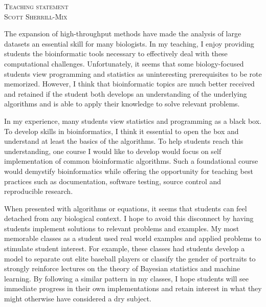 \documentclass[12pt]{article}
\date{\today}
\begin{document}

\begin{center}
\fontsize{19}{21}\textsc{Teaching statement}\\
\vspace{.4em}
\fontsize{14}{17}\textsc{Scott Sherrill-Mix}
\end{center}

The expansion of high-throughput methods have made the analysis of large datasets an essential skill for many biologists. In my teaching, I enjoy providing students the bioinformatic tools necessary to effectively deal with these computational challenges. Unfortunately, it seems that some biology-focused students view programming and statistics as uninteresting prerequisites to be rote memorized. However, I think that bioinformatic topics are much better received and retained if the student both develops an understanding of the underlying algorithms and is able to apply their knowledge to solve relevant problems. 

In my experience, many students view statistics and programming as a black box.  To develop skills in bioinformatics, I think it essential to open the box and understand at least the basics of the algorithms.  To help students reach this understanding, one course I would like to develop would focus on self implementation of common bioinformatic algorithms. Such a foundational course would demystify bioinformatics while offering the opportunity for teaching best practices such as documentation, software testing, source control and reproducible research. 

When presented with algorithms or equations, it seems that students can feel detached from any biological context. I hope to avoid this disconnect by having students implement solutions to relevant problems and examples. My most memorable classes as a student used real world examples and applied problems to stimulate student interest. For example, these classes had students develop a model to separate out elite baseball players or classify the gender of portraits to strongly reinforce lectures on the theory of Bayesian statistics and machine learning. By following a similar pattern in my classes, I hope students will see immediate progress in their own implementations and retain interest in what they might otherwise have considered a dry subject.
  
\end{document}

